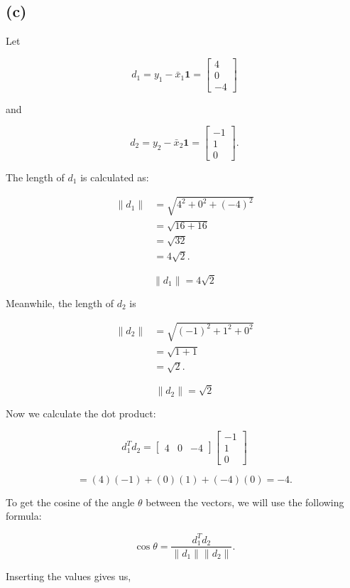 \documentclass{article}
\begin{document}
\subsection*{(c)}

Let

$$
d_1=y_1-\bar{x}_1\mathbf{1}
=
\begin{bmatrix}
4\\
0\\
-4
\end{bmatrix}
$$

and

$$
d_2=y_2-\bar{x}_2\mathbf{1}
=
\begin{bmatrix}
-1\\
1\\
0
\end{bmatrix}.
$$

The length of $d_1$ is calculated as:

$$
\begin{aligned}
\|d_1\|
&=
\sqrt{4^2+0^2+(-4)^2}\\
&=
\sqrt{16+16}\\
&=
\sqrt{32}\\
&=
4\sqrt{2}.
\end{aligned}
$$

$$
\boxed{\|d_1\|=4\sqrt{2}}
$$

Meanwhile, the length of $d_2$ is

$$
\begin{aligned}
\|d_2\|
&=
\sqrt{(-1)^2+1^2+0^2}\\
&=
\sqrt{1+1}\\
&=
\sqrt{2}.
\end{aligned}
$$

$$
\boxed{\|d_2\|=\sqrt{2}}
$$

Now we calculate the dot product:

$$
d_1^Td_2
=
\begin{bmatrix}
4&0&-4
\end{bmatrix}
\begin{bmatrix}
-1\\
1\\
0
\end{bmatrix}
$$

$$
=
(4)(-1)+(0)(1)+(-4)(0)
=
-4.
$$

To get the cosine of the angle $\theta$ between the vectors, we will use the following formula:

$$
\cos\theta
=
\frac{d_1^Td_2}
{\|d_1\|\|d_2\|}.
$$

Inserting the values gives us,
\end{document}
